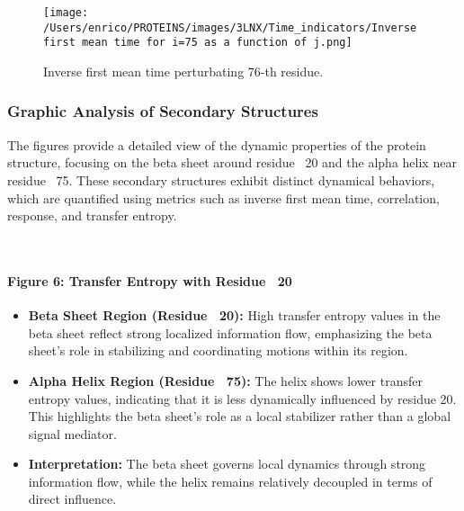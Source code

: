 \documentclass[English, Lau, oneside]{sapthesis}
\begin{document}
\begin{figure}[h!]
    \centering
    \texttt{[image: /Users/enrico/PROTEINS/images/3LNX/Time\_indicators/Inverse first mean time for i=75 as a function of j.png]}
    \caption{Inverse first mean time perturbating 76-th residue.}
\end{figure}

\newpage
\newpage






\subsubsection*{Graphic Analysis of Secondary Structures}
The figures provide a detailed view of the dynamic properties of the protein structure, focusing on the beta sheet around residue ~20 and the alpha helix near residue ~75. These secondary structures exhibit distinct dynamical behaviors, which are quantified using metrics such as inverse first mean time, correlation, response, and transfer entropy.


\


\paragraph{Figure 6: Transfer Entropy with Residue ~20}
\begin{itemize}
    \item \textbf{Beta Sheet Region (Residue ~20):} High transfer entropy values in the beta sheet reflect strong localized information flow, emphasizing the beta sheet's role in stabilizing and coordinating motions within its region.
    \item \textbf{Alpha Helix Region (Residue ~75):} The helix shows lower transfer entropy values, indicating that it is less dynamically influenced by residue 20. This highlights the beta sheet's role as a local stabilizer rather than a global signal mediator.
    \item \textbf{Interpretation:} The beta sheet governs local dynamics through strong information flow, while the helix remains relatively decoupled in terms of direct influence.
\end{itemize}
\end{document}
